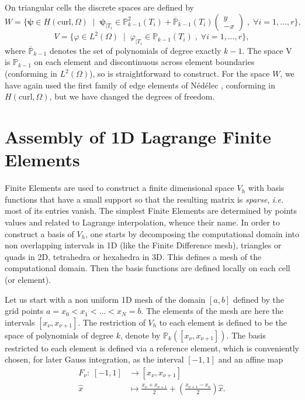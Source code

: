 On triangular cells the discrete spaces are defined by
\[
W=\{\boldsymbol{\psi}\in
H(\mathrm{curl},\Omega)\;\;|\;\;\boldsymbol{\psi}_{|T_i}\in
\mathbb{P}_{k-1}^2(T_i)+\overline{\mathbb{P}}_{k-1}(T_i)\left(\begin{array}{c}y\\-x\end{array}\right)\;,\;\forall
i=1,\dots,r\},
\]
\[
V=\{\varphi\in L^2(\Omega)\;\; | \;\;
\varphi_{|T_i}\in\mathbb{P}_{k-1}(T_i)\;,\;\forall i=1,\dots,r\},
\]
where $\overline{\mathbb{P}}_{k-1}$ denotes the set of polynomials of degree exactly $k-1$. The space V
is $\mathbb{P}_{k-1}$ on each element and discontinuous across element boundaries (conforming in $L^2(\Omega)$), so
is straightforward to construct. For the space $W$, we have again used the first family of edge elements of N\'ed\'elec 
\cite{nedelec1980}, conforming in $H(\mathrm{curl},\Omega)$, but we have changed the degrees of freedom.

 
 \section{Assembly of 1D Lagrange Finite Elements}

Finite Elements are used to construct a finite dimensional space $V_h$ with basis functions that have a small support so that the resulting matrix is \emph{sparse}, \textit{i.e.} most of its entries vanish.
The simplest Finite Elements are determined by points values and related to Lagrange interpolation, whence their name. In order to construct a basis of $V_h$, one starts by decomposing the computational domain into non overlapping intervals in 1D (like the Finite Difference mesh), triangles or quads in 2D, tetrahedra or hexahedra in 3D. This defines a mesh of the computational domain. Then the basis functions are defined locally on each cell (or element).


Let us start with a non uniform 1D mesh of the domain $[a,b]$ defined by the grid points $a=x_0< x_1 < \dots < x_N=b$. The elements of the mesh are here the intervals $[x_{\nu}, x_{\nu+1}]$. 
The restriction of $V_h$ to each element is defined to be the space of polynomials of degree $k$, denote by
$ \mathbb{P}_k([x_{\nu}, x_{\nu+1}])$.
The basis restricted to each element is defined via a reference element, which is conveniently chosen, for later Gauss integration,  as the interval  $[-1,1]$ and an affine map 
\begin{align*}
F_\nu: \;[-1,1] &\rightarrow [x_{\nu}, x_{\nu+1}] \\
\hat{x} &\mapsto \frac{x_\nu+x_{\nu+1}}{2} +  \left(\frac{x_{\nu+1} -  x_\nu}{2}\right) \hat{x}.
\end{align*}


